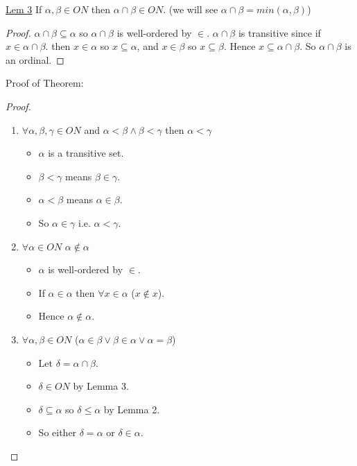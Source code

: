 \documentclass{article}
\begin{document}
    \underline{Lem 3} If $\alpha, \beta \in ON$ then $\alpha \cap \beta \in ON$.
    (we will see $\alpha \cap \beta = min(\alpha, \beta)$)

    \begin{proof}
        $\alpha \cap \beta \subseteq \alpha$ so $\alpha \cap \beta$ is well-ordered by $\in$.
        $\alpha \cap \beta$ is transitive since if $x \in \alpha \cap \beta$.
        then $x \in \alpha$ so $x \subseteq \alpha$, and $x \in \beta$ so $x \subseteq \beta$.
        Hence $x \subseteq \alpha \cap \beta$.
        So $\alpha \cap \beta$ is an ordinal.
    \end{proof}

Proof of Theorem:
\begin{proof}
    \begin{enumerate}
        \item $\forall \alpha, \beta, \gamma \in ON$ and $\alpha < \beta \wedge \beta < \gamma$ then $\alpha < \gamma$
        \begin{itemize}
            \item $\alpha$ is a transitive set.
            \item $\beta < \gamma$ means $\beta \in \gamma$.
            \item $\alpha < \beta$ means $\alpha \in \beta$.
            \item So $\alpha \in \gamma$ i.e. $\alpha < \gamma$.
        \end{itemize}
        \item $\forall \alpha \in ON$ $\alpha \notin \alpha$
        \begin{itemize}
            \item $\alpha$ is well-ordered by $\in$.
            \item If $\alpha \in \alpha$ then $\forall x \in \alpha$ ($x \notin x$).
            \item Hence $\alpha \notin \alpha$.
        \end{itemize}
        \item $\forall \alpha, \beta \in ON$ ($\alpha \in \beta \vee \beta \in \alpha \vee \alpha = \beta$)
        \begin{itemize}
            \item Let $\delta = \alpha \cap \beta$.
            \item $\delta \in ON$ by Lemma 3.
            \item $\delta \subseteq \alpha$ so $\delta \leq \alpha$ by Lemma 2.
            \item So either $\delta = \alpha$ or $\delta \in \alpha$.

\end{itemize}
\end{enumerate}
\end{proof}
\end{document}
